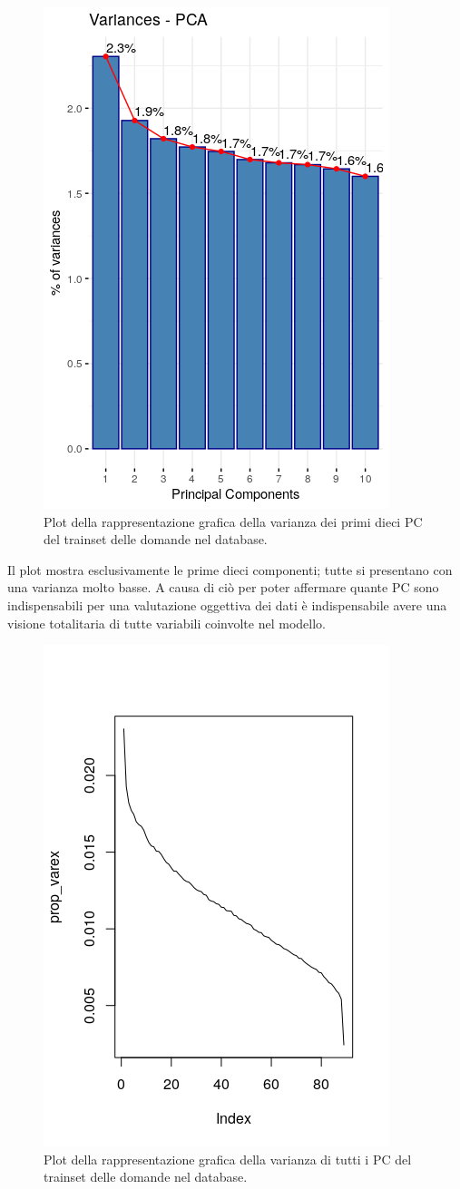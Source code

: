 \begin{figure}[H]
\centering
	\includegraphics[width=0.60\linewidth]{../../PCA/plot/variances_rete-db.png}
	\caption{Plot della rappresentazione grafica della varianza dei primi dieci PC del trainset delle domande nel database.}
	\label{Plot della rappresentazione grafica della varianza dei primi dieci PC del trainset delle domande nel database.}
\end{figure}
\noindent
Il plot mostra esclusivamente le prime dieci componenti; tutte si presentano con una varianza molto basse. A causa di ci\`o per poter affermare quante PC sono indispensabili per una valutazione oggettiva dei dati \`e indispensabile avere una visione totalitaria di tutte variabili coinvolte nel modello.
\begin{figure}[H]
\centering
	\includegraphics[width=0.60\linewidth]{../../PCA/plot/variances-ALL_rete-db.png}
	\caption{Plot della rappresentazione grafica della varianza di tutti i PC del trainset delle domande nel database.}
	\label{Plot della rappresentazione grafica della varianza di tutti i PC del trainset delle domande nel database.}
\end{figure}
